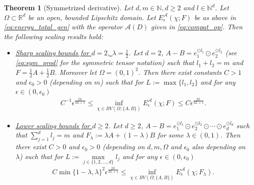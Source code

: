 \documentclass[a4paper, 10pt, twoside, notitlepage]{amsart}
\theoremstyle{plain}
\newtheorem{thm}{Theorem}
\newcommand{\R}{\mathbb{R}}
\newcommand{\N}{\mathbb{N}}
\newcommand{\A}{\mathcal{A}}
\begin{document}
	\begin{thm}[Symmetrized derivative]
		\label{thm:scaling_2D_new}
		Let $d,m \in \N, d \geq 2$ and $l \in \N^d$. Let $\Omega \subset \R^d$ be an open, bounded Lipschitz domain. Let $E_{\epsilon}^{\A}(\chi;F)$ be as above in \cref{eq:energy_total_gen}  with the operator $\A(D)$ given in \cref{eq:compat_op}. Then the following scaling results hold:
		\begin{itemize}
			\item \underline{Sharp scaling bounds for $d=2$, $\lambda=\frac{1}{2}$}. Let $d=2$, $A-B = e_1^{\odot l_1} \odot e_2^{\odot l_2}$ (see \cref{eq:sym_prod} for the symmetric
			tensor notation) such that $l_1 + l_2 =m$ and $F= \frac{1}{2}A+\frac{1}{2}B$.  Moreover let $\Omega = (0,1)^2$. Then there exist constants
			$C>1$ and $\epsilon_0 > 0$ (depending on $m$) such that for $L:= \max\{l_1, l_2\}$ and for any $\epsilon \in (0,\epsilon_0)$
			\begin{align*}
				C^{-1} \epsilon^{\frac{2L}{2L+1}} \leq \inf\limits_{\chi \in BV(\Omega;\{A,B\})} E_{\epsilon}^{\A}(\chi;F) \leq C \epsilon^{\frac{2L}{2L+1}}.
			\end{align*}
			\item \underline{Lower scaling bounds for $d\geq 2$}. Let $d\geq 2$, $A-B = e_1^{\odot l_1} \odot e_2^{\odot l_2} \odot \cdots \odot e_d^{\odot l_d}$ such
			that $\sum_{j = 1}^{d} l_{j} = m$ and $F_{\lambda}:= \lambda A + (1-\lambda ) B$ for some $\lambda \in (0,1)$. Then there exist $C>0$ and $\epsilon_0>0$ (depending on $d, m, \Omega$ and $\epsilon_0$ also depending on $\lambda$) such
			that for $L:=\max\limits_{j\in\{1,2,\dots,d\}}l_j$ and for any $\epsilon \in (0,\epsilon_0)$
			\begin{align*}
				C \min\{1-\lambda,\lambda\}^2\epsilon^{\frac{2L}{2L+1}} \leq \inf\limits_{\chi \in BV(\Omega;\{A,B\})} E_{\epsilon}^{\A}(\chi; F_{\lambda}) .
			\end{align*}
		\end{itemize}
	\end{thm}
	
\end{document}
